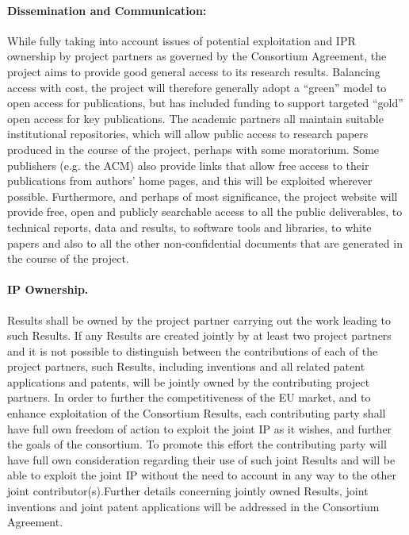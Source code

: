 \documentclass[a4paper,11pt]{article}
\begin{document}
\paragraph{Dissemination and Communication:}
While fully taking into account issues of potential exploitation and IPR ownership by project partners
as governed by the Consortium Agreement,
the project aims to provide good general access to its research results.
Balancing access with cost, the project will therefore generally adopt a ``green'' model to open access for publications,
but has included funding to support targeted ``gold'' open access for key publications.
The academic partners all maintain suitable institutional repositories, which will allow public access to research papers produced in the
course of the project, perhaps with some moratorium.  Some publishers (e.g. the ACM) also provide links that allow
free access to their publications from authors' home pages, and this will be exploited wherever possible.
%
Furthermore, and perhaps of most significance, the project website will provide free,
open and publicly searchable access to all the public deliverables, to technical reports, data and results, to software tools
and libraries, to white papers and also to all
the other non-confidential documents that are generated in the course of the project.  


\pagebreak
\paragraph{IP Ownership.}

Results shall be owned by the project partner carrying out the work
leading to such Results. If any Results are created jointly by at least
two project partners and it is not possible to distinguish between the
contributions of each of the project partners, such Results, including
inventions and all related patent applications and patents, will be
jointly owned by the contributing project partners. In order to further
the competitiveness of the EU market, and to enhance exploitation of the
Consortium Results, each contributing party shall have full own freedom
of action to exploit the joint IP as it wishes, and further the goals of
the consortium. To promote this effort the contributing party will have
full own consideration regarding their use of such joint Results and will
be able to exploit the joint IP without the need to account in any way to
the other joint contributor(s).Further details concerning jointly owned
Results, joint inventions and joint patent applications will be addressed
in the Consortium Agreement.
\end{document}
